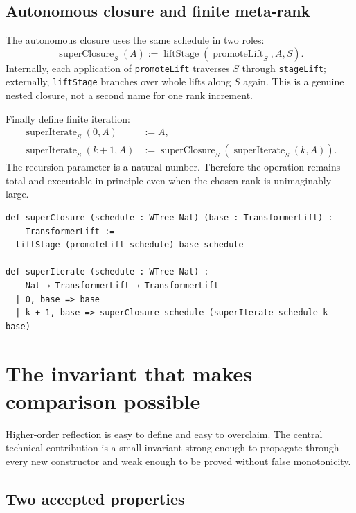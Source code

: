 \documentclass[11pt]{article}
\theoremstyle{definition}
\theoremstyle{remark}
\newcommand{\leanname}[1]{\nolinkurl{#1}}
\begin{document}
\subsection{Autonomous closure and finite meta-rank}

The autonomous closure uses the same schedule in two roles:
\[
  \operatorname{superClosure}_S(A)
  :=\operatorname{liftStage}(\operatorname{promoteLift}_S,A,S).
\]
Internally, each application of \leanname{promoteLift} traverses $S$ through
\leanname{stageLift}; externally, \leanname{liftStage} branches over whole lifts
along $S$ again.  This is a genuine nested closure, not a second name for one
rank increment.

Finally define finite iteration:
\begin{align*}
  \operatorname{superIterate}_S(0,A)&:=A,\\
  \operatorname{superIterate}_S(k+1,A)&:=
    \operatorname{superClosure}_S(
       \operatorname{superIterate}_S(k,A)).
\end{align*}
The recursion parameter is a natural number.  Therefore the operation remains
total and executable in principle even when the chosen rank is unimaginably
large.

\begin{lstlisting}[caption={Autonomous third-order closure and its finite meta-rank hierarchy.}]
def superClosure (schedule : WTree Nat) (base : TransformerLift) :
    TransformerLift :=
  liftStage (promoteLift schedule) base schedule

def superIterate (schedule : WTree Nat) :
    Nat → TransformerLift → TransformerLift
  | 0, base => base
  | k + 1, base => superClosure schedule (superIterate schedule k base)
\end{lstlisting}

\section{The invariant that makes comparison possible}

Higher-order reflection is easy to define and easy to overclaim.  The central
technical contribution is a small invariant strong enough to propagate through
every new constructor and weak enough to be proved without false monotonicity.

\subsection{Two accepted properties}
\end{document}
